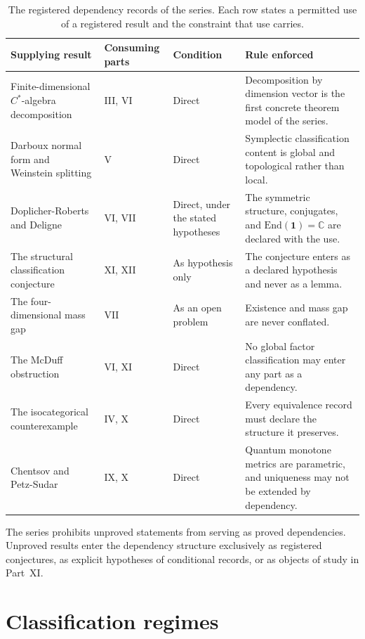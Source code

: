 \documentclass[11pt,letterpaper]{article}
\theoremstyle{definition}
\theoremstyle{remark}
\begin{document}
\begin{table}[t]
\centering
\small
\caption{The registered dependency records of the series. Each row states a permitted use of a registered result and the constraint that use carries.}
\label{tab:deps}
\begin{tabularx}{\textwidth}{Y{0.62}Y{0.95}Y{1.03}Y{1.4}}
\toprule
Supplying result & Consuming parts & Condition & Rule enforced \\
\midrule
Finite-dimensional $C^*$-algebra decomposition \cite{corpus-9} & III, VI & Direct & Decomposition by dimension vector is the first concrete theorem model of the series. \\
Darboux normal form and Weinstein splitting \cite{corpus-6,corpus-68} & V & Direct & Symplectic classification content is global and topological rather than local. \\
Doplicher-Roberts and Deligne \cite{corpus-12,corpus-13,corpus-67} & VI, VII & Direct, under the stated hypotheses & The symmetric structure, conjugates, and $\mathrm{End}(\mathbf{1})=\mathbb{C}$ are declared with the use. \\
The structural classification conjecture & XI, XII & As hypothesis only & The conjecture enters as a declared hypothesis and never as a lemma. \\
The four-dimensional mass gap & VII & As an open problem & Existence and mass gap are never conflated. \\
The McDuff obstruction \cite{corpus-65} & VI, XI & Direct & No global factor classification may enter any part as a dependency. \\
The isocategorical counterexample \cite{corpus-74} & IV, X & Direct & Every equivalence record must declare the structure it preserves. \\
Chentsov and Petz-Sudar \cite{corpus-52} & IX, X & Direct & Quantum monotone metrics are parametric, and uniqueness may not be extended by dependency. \\
\bottomrule
\end{tabularx}
\end{table}

The series prohibits unproved statements from serving as proved dependencies. Unproved results enter the dependency structure exclusively as registered conjectures, as explicit hypotheses of conditional records, or as objects of study in Part~XI.

\section{Classification regimes}
\end{document}
